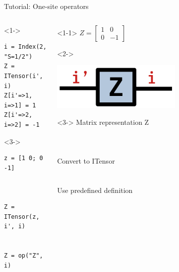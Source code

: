\begin{frame}[fragile]{Tutorial: One-site operators}

\begin{columns}

\begin{column}{4.5cm}

\begin{onlyenv}<1->
\begin{lstlisting}[language=JuliaLocal, style=julia, basicstyle=\scriptsize\ttfamily]
i = Index(2, "S=1/2")
Z = ITensor(i', i)
Z[i'=>1, i=>1] = 1
Z[i'=>2, i=>2] = -1
\end{lstlisting}
\end{onlyenv}

\begin{onlyenv}<3->
\begin{lstlisting}[language=JuliaLocal, style=julia, basicstyle=\scriptsize\ttfamily]
z = [1 0; 0 -1]



Z = ITensor(z, i', i)


Z = op("Z", i)
\end{lstlisting}
\end{onlyenv}

\end{column}

\begin{column}{4.5cm}

\begin{onlyenv}<1-1>
$Z = \begin{bmatrix} 1 & 0 \\ 0 & -1 \end{bmatrix}$
\end{onlyenv}

\begin{onlyenv}<2->
\begin{center}
\includegraphics[width=0.6\textwidth]{
  slides/assets/Z.png
}
\end{center}
\vspace*{0.5cm}
\end{onlyenv}

\begin{onlyenv}<3->
Matrix representation Z \\
~\\
~\\
~\\
Convert to ITensor \\
~\\
~\\
Use predefined definition
\end{onlyenv}

\end{column}

\end{columns}

\end{frame}
